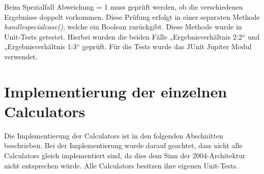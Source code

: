 Beim Spezialfall Abweichung = 1 muss geprüft werden, ob die verschiedenen Ergebnisse doppelt vorkommen. Diese Prüfung erfolgt in einer separaten Methode \textit{handle\textunderscore special\textunderscore case()}, welche ein Boolean zurückgibt. Diese Methode wurde in Unit-Tests getestet. Hierbei wurden die beiden Fälle „Ergebnisverhältnis 2:2“ und „Ergebnisverhältnis 1:3“ geprüft. Für die Tests wurde das JUnit Jupiter Modul verwendet.


\section{Implementierung der einzelnen Calculators}
Die Implementierung der Calculators ist in den folgenden Abschnitten beschrieben. Bei der Implementierung wurde darauf geachtet, dass nicht alle Calculators gleich implementiert sind, da dies dem Sinn der 2004-Architektur nicht entsprechen würde. Alle Calculators besitzen ihre eigenen Unit-Tests. 

